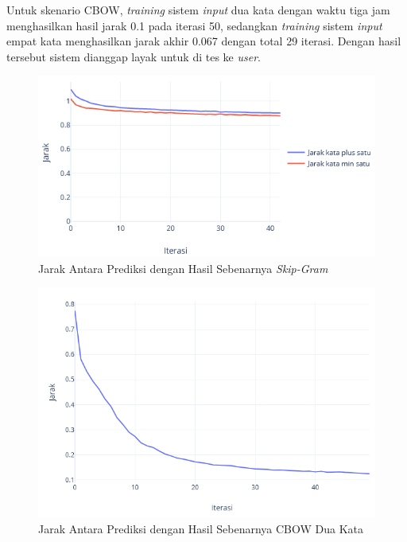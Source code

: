 \documentclass[12pt]{report}
\begin{document}
Untuk skenario CBOW, \textit{training} sistem \textit{input} dua kata dengan waktu tiga jam menghasilkan hasil jarak 0.1 pada iterasi 50, sedangkan \textit{training} sistem \textit{input} empat kata menghasilkan jarak akhir 0.067 dengan total 29 iterasi. Dengan hasil tersebut sistem dianggap layak untuk di tes ke \textit{user}.

\begin{figure}[H]
\centering
\includegraphics[scale=0.75]{jarakskipgram}
\caption{Jarak Antara Prediksi dengan Hasil Sebenarnya \textit{Skip-Gram}}
\label{jarakskipgram}
\end{figure}

\begin{figure}[H]
\centering
\includegraphics[scale=0.75]{jarakcbow}
\caption{Jarak Antara Prediksi dengan Hasil Sebenarnya CBOW Dua Kata}
\label{jarakcbow}
\end{figure}
\end{document}
